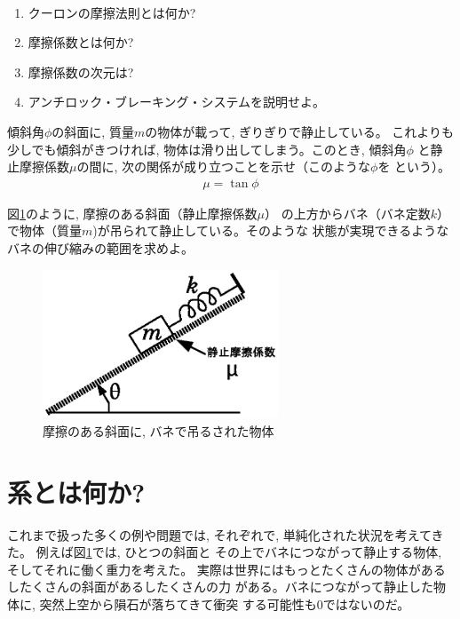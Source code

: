 \begin{q}\label{q:friction}　
\begin{enumerate}
\item クーロンの摩擦法則とは何か?
\item 摩擦係数とは何か?
\item 摩擦係数の次元は?
\item アンチロック・ブレーキング・システムを説明せよ。
\end{enumerate}
\end{q}
\mv

\begin{q}\label{q:friction_slope}
傾斜角$\phi$の斜面に, 質量$m$の物体が載って, ぎりぎりで静止している。
これよりも少しでも傾斜がきつければ, 物体は滑り出してしまう。このとき, 傾斜角$\phi$
と静止摩擦係数$\mu$の間に, 次の関係が成り立つことを示せ（このような$\phi$を
という）。
\begin{eqnarray}
\mu=\tan \phi
\end{eqnarray}
\end{q}

\begin{q}\label{q:slope_spring_friction}
図\ref{fig:slope_spring_friction}のように, 摩擦のある斜面（静止摩擦係数$\mu$）
の上方からバネ（バネ定数$k$）で物体（質量$m$)が吊られて静止している。そのような
状態が実現できるようなバネの伸び縮みの範囲を求めよ。
\begin{figure}[h]
    \centering
    \includegraphics[width=7cm]{slope_spring_friction.eps}
    \caption{摩擦のある斜面に, バネで吊るされた物体}\label{fig:slope_spring_friction}
\end{figure}
\end{q}
\hv


\section{系とは何か?}

これまで扱った多くの例や問題では, それぞれで, 単純化された状況を考えてきた。
例えば図\ref{fig:slope_spring_friction}では, ひとつの斜面と
その上でバネにつながって静止する物体, そしてそれに働く重力を考えた。
実際は世界にはもっとたくさんの物体があるしたくさんの斜面があるしたくさんの力
がある。バネにつながって静止した物体に, 突然上空から隕石が落ちてきて衝突
する可能性も0ではないのだ。

